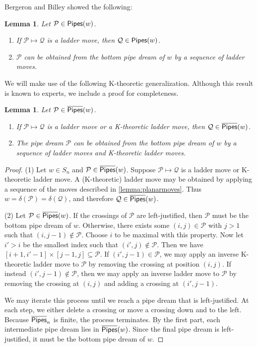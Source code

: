\documentclass[12 pt]{amsart}
\newtheorem{lemma}[Theorem]{Lemma}
\numberwithin{equation}{section}
\theoremstyle{remark}
\newcommand{\pipes}{{\sf Pipes}}
\newcommand{\kpipes}{\overline{\sf Pipes}}
\newcommand{\demprod}{\delta}
\begin{document}
		Bergeron and Billey \cite{Bergeron.Billey} showed the following:
		\begin{lemma}
			Let $\mathcal{P} \in \pipes(w)$. 
			\begin{enumerate}
				\item If $\mathcal{P} \mapsto \mathcal{Q}$ is a ladder move, then $\mathcal{Q} \in \pipes(w)$.
				\item $\mathcal{P}$ can be obtained from the bottom pipe dream of $w$ by a sequence of ladder moves.
			\end{enumerate} 
		\end{lemma}
		
		We will make use of the following K-theoretic generalization. Although this result is known to experts, we include a proof for completeness.
		
		\begin{lemma}
			\label{lemma:kladdermoves}
			Let $\mathcal{P} \in \kpipes(w)$. 
			\begin{enumerate}
				\item If $\mathcal{P} \mapsto \mathcal{Q}$ is a ladder move or a K-theoretic ladder move, then $\mathcal{Q} \in \kpipes(w)$.
				\item The pipe dream $\mathcal{P}$ can be obtained from the bottom pipe dream of $w$ by a sequence of ladder moves and K-theoretic ladder moves.
			\end{enumerate}
		\end{lemma}
		\begin{proof}
			\noindent (1) Let $w \in S_n$ and $\mathcal{P} \in \kpipes(w)$. Suppose $\mathcal{P} \mapsto \mathcal{Q}$ is a ladder move or K-theoretic ladder move. A (K-theoretic) ladder move may be obtained by applying a sequence of the moves described in \cref{lemma:planarmoves}. Thus $w = \demprod(\mathcal{P}) = \demprod(\mathcal{Q})$, and therefore $\mathcal{Q} \in \kpipes(w)$.
						
			\noindent (2) Let $\mathcal{P} \in \kpipes(w)$. 
			If the crossings of $\mathcal{P}$ are left-justified, then $\mathcal{P}$ must be the bottom pipe dream of $w$. 
			Otherwise, there exists some $(i, j) \in \mathcal{P}$ with $j > 1$ such that $(i, j - 1)\notin \mathcal{P}$. 
			Choose $i$ to be maximal with this property. Now let $i' > i$ be the smallest index such that $(i', j)\notin \mathcal{P}$. 
			Then we have $[i + 1, i'- 1] \times [j - 1, j] \subseteq \mathcal{P}$. 
			If $(i',j-1) \in \mathcal{P}$, we may apply an inverse K-theoretic ladder move to $\mathcal{P}$ by removing the crossing at position $(i, j)$. 
			If instead $(i', j - 1) \notin \mathcal{P}$, then we may apply an inverse ladder move to $\mathcal{P}$ by removing the crossing at $(i, j)$ and adding a crossing at $(i', j - 1)$.
			
			We may iterate this process until we reach a pipe dream that is left-justified. At each step, we either delete a crossing or move a crossing down and to the left. Because $\kpipes_n$ is finite, the process terminates. By the first part, each intermediate pipe dream lies in $\kpipes(w)$. Since the final pipe dream is left-justified, it must be the bottom pipe dream of $w$.
		\end{proof}
		
\end{document}
